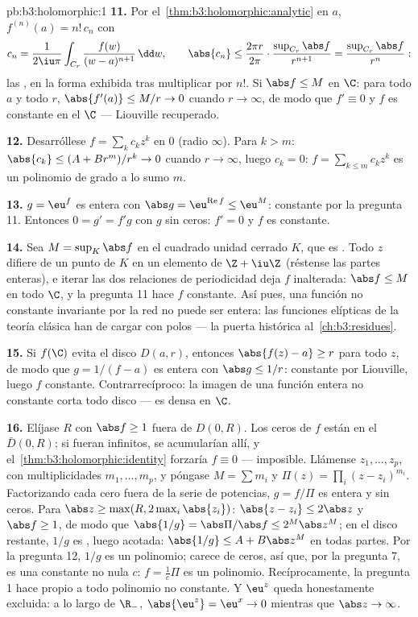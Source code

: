 \begin{solution}{pb:b3:holomorphic:1}
\textbf{11.} Por el~\cref{thm:b3:holomorphic:analytic} en $a$,
$f^{(n)}(a) = n!\,c_n$ con
\[
c_n = \frac1{2\iu\pi}\int_{C_r}\frac{f(w)}{(w -
a)^{n+1}}\,\dd w,
\qquad
\abs{c_n} \leq \frac{2\pi r}{2\pi}\cdot
\frac{\sup_{C_r}\abs f}{r^{n+1}}
= \frac{\sup_{C_r}\abs f}{r^{n}} :
\]
las , en la
forma exhibida tras multiplicar por $n!$. Si $\abs f \leq M$ en $\C$:
para todo $a$ y todo $r$, $\abs{f'(a)} \leq M/r \to 0$ cuando $r \to
\infty$, de modo que $f' \equiv 0$ y $f$ es constante en el
 $\C$ --- Liouville
recuperado.

\textbf{12.} Desarróllese $f = \sum_kc_kz^k$ en $0$ (radio $\infty$).
Para $k > m$: $\abs{c_k} \leq (A + Br^m)/r^k \to
0$ cuando $r \to \infty$, luego $c_k = 0$: $f =
\sum_{k\leq m}c_kz^k$ es un polinomio de grado a lo sumo $m$.

\textbf{13.} $g = \eu^f$ es entera con $\abs g =
\eu^{\operatorname{Re}f} \leq \eu^M$: constante por la pregunta 11.
Entonces $0 = g' = f'g$ con $g$ sin ceros: $f' = 0$ y $f$ es constante.

\textbf{14.} Sea $M = \sup_K\abs f$ en el cuadrado unidad cerrado $K$,
que es . Todo $z$ difiere de
un punto de $K$ en un elemento de $\Z + \iu\Z$ (réstense las partes
enteras), e iterar las dos relaciones de periodicidad deja $f$
inalterada: $\abs f \leq M$ en todo $\C$, y la pregunta 11 hace $f$
constante. Así pues, una función no constante invariante por la red no
puede ser entera: las funciones elípticas de la teoría clásica han de
cargar con polos --- la puerta histórica al~\cref{ch:b3:residues}.

\textbf{15.} Si $f(\C)$ evita el disco $D(a, r)$, entonces
$\abs{f(z) - a} \geq r$ para todo $z$, de modo que $g = 1/(f - a)$ es
entera con $\abs g \leq 1/r$: constante por Liouville, luego $f$
constante. Contrarrecíproco: la imagen de una función entera no
constante corta todo disco --- es densa en $\C$.

\textbf{16.} Elíjase $R$ con $\abs f \geq 1$ fuera de $D(0, R)$. Los
ceros de $f$ están en el 
$\bar D(0, R)$; si fueran infinitos, se acumularían allí, y
el~\cref{thm:b3:holomorphic:identity} forzaría $f
\equiv 0$ --- imposible. Llámense $z_1, \dots, z_p$, con multiplicidades
$m_1, \dots, m_p$, y póngase $M = \sum m_i$ y
$\Pi(z) = \prod_i(z - z_i)^{m_i}$. Factorizando cada cero fuera de la
serie de potencias, $g = f/\Pi$ es entera y sin ceros. Para
$\abs z \geq \max(R, 2\max_i\abs{z_i})$: $\abs{z - z_i}
\leq 2\abs z$ y $\abs f \geq 1$, de modo que $\abs{1/g} =
\abs\Pi/\abs f \leq 2^M\abs z^M$; en el disco
 restante, $1/g$ es
, luego acotada:
$\abs{1/g} \leq A +
B\abs z^M$ en todas partes. Por la pregunta 12, $1/g$ es un polinomio;
carece de ceros, así que, por la pregunta 7, es una constante no nula
$c$: $f = \frac1c\Pi$ es un polinomio. Recíprocamente, la pregunta 1
hace propio a todo polinomio no constante. Y $\eu^z$ queda honestamente
excluida: a lo largo de $\R_-$, $\abs{\eu^z} = \eu^x \to 0$ mientras que
$\abs z \to \infty$.


\end{solution}
